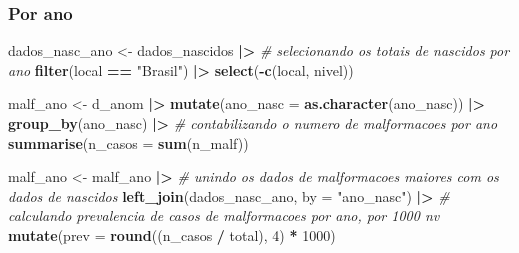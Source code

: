 \documentclass[
]{article}
\newenvironment{Shaded}{\begin{snugshade}}{\end{snugshade}}
\newcommand{\AttributeTok}[1]{\textcolor[rgb]{0.13,0.29,0.53}{#1}}
\newcommand{\CommentTok}[1]{\textcolor[rgb]{0.56,0.35,0.01}{\textit{#1}}}
\newcommand{\DecValTok}[1]{\textcolor[rgb]{0.00,0.00,0.81}{#1}}
\newcommand{\FunctionTok}[1]{\textcolor[rgb]{0.13,0.29,0.53}{\textbf{#1}}}
\newcommand{\NormalTok}[1]{#1}
\newcommand{\OtherTok}[1]{\textcolor[rgb]{0.56,0.35,0.01}{#1}}
\newcommand{\SpecialCharTok}[1]{\textcolor[rgb]{0.81,0.36,0.00}{\textbf{#1}}}
\newcommand{\StringTok}[1]{\textcolor[rgb]{0.31,0.60,0.02}{#1}}
\begin{document}
\hypertarget{por-ano}{%
\subsubsection{Por ano}\label{por-ano}}

\begin{Shaded}
\begin{Highlighting}[]
\NormalTok{dados\_nasc\_ano }\OtherTok{\textless{}{-}}\NormalTok{ dados\_nascidos }\SpecialCharTok{|\textgreater{}} 
  \CommentTok{\# selecionando os totais de nascidos por ano}
  \FunctionTok{filter}\NormalTok{(local }\SpecialCharTok{==} \StringTok{"Brasil"}\NormalTok{) }\SpecialCharTok{|\textgreater{}} 
  \FunctionTok{select}\NormalTok{(}\SpecialCharTok{{-}}\FunctionTok{c}\NormalTok{(local, nivel))}

\NormalTok{malf\_ano }\OtherTok{\textless{}{-}}\NormalTok{ d\_anom }\SpecialCharTok{|\textgreater{}} 
  \FunctionTok{mutate}\NormalTok{(}\AttributeTok{ano\_nasc =} \FunctionTok{as.character}\NormalTok{(ano\_nasc)) }\SpecialCharTok{|\textgreater{}} 
  \FunctionTok{group\_by}\NormalTok{(ano\_nasc) }\SpecialCharTok{|\textgreater{}} 
  \CommentTok{\# contabilizando o numero de malformacoes por ano}
  \FunctionTok{summarise}\NormalTok{(}\AttributeTok{n\_casos =} \FunctionTok{sum}\NormalTok{(n\_malf))}

\NormalTok{malf\_ano }\OtherTok{\textless{}{-}}\NormalTok{ malf\_ano }\SpecialCharTok{|\textgreater{}} 
  \CommentTok{\# unindo os dados de malformacoes maiores com os dados de nascidos}
  \FunctionTok{left\_join}\NormalTok{(dados\_nasc\_ano, }\AttributeTok{by =} \StringTok{"ano\_nasc"}\NormalTok{) }\SpecialCharTok{|\textgreater{}} 
  \CommentTok{\# calculando prevalencia de casos de malformacoes por ano, por 1000 nv}
  \FunctionTok{mutate}\NormalTok{(}\AttributeTok{prev =} \FunctionTok{round}\NormalTok{((n\_casos }\SpecialCharTok{/}\NormalTok{ total), }\DecValTok{4}\NormalTok{) }\SpecialCharTok{*} \DecValTok{1000}\NormalTok{)}
\end{Highlighting}
\end{Shaded}
\end{document}

